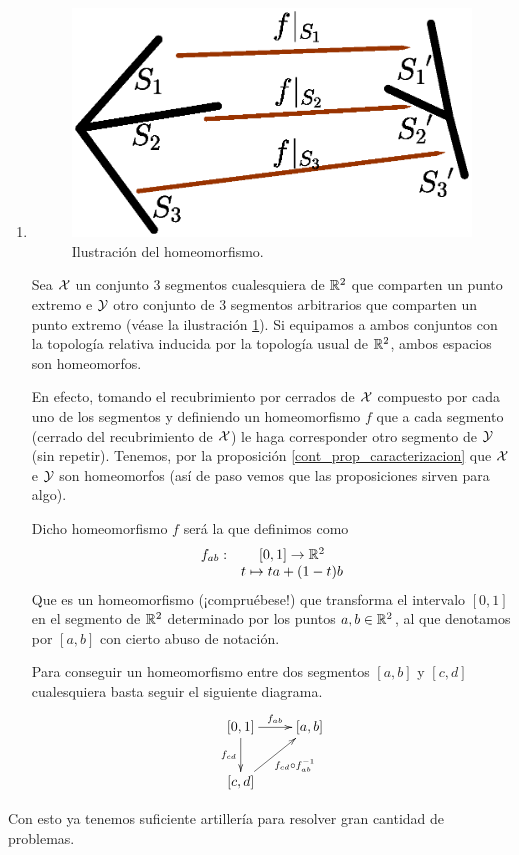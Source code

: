 \begin{exa}[Homeomorfismos]
\begin{enumerate}
		\item \begin{figure}[h!]
			\centering
			\includegraphics[scale = 0.3]{img/segmentos}
			\caption{Ilustración del homeomorfismo.}
			\label{cont_img_sementos}
		\end{figure}
		
		Sea $\mathcal{X}$ un conjunto $3$ segmentos cualesquiera de $\mathbb{R}^2$ que comparten un punto extremo e $\mathcal{Y}$ otro conjunto de $3$ segmentos arbitrarios que comparten un punto extremo (véase la ilustración \ref{cont_img_sementos}). Si equipamos a ambos conjuntos con la topología relativa inducida por la topología usual de $\mathbb{R}^2$, ambos espacios son homeomorfos.
		
		En efecto, tomando el recubrimiento por cerrados de $\mathcal{X}$ compuesto por cada uno de los segmentos y definiendo un homeomorfismo $f$ que a cada segmento (cerrado del recubrimiento de $\mathcal{X}$) le haga corresponder otro segmento de $\mathcal{Y}$ (sin repetir). Tenemos, por la proposición \ref{cont_prop_caracterizacion} que $\mathcal{X}$ e $\mathcal{Y}$ son homeomorfos (así de paso vemos que las proposiciones sirven para algo).
		
		Dicho homeomorfismo $f$ será la  que definimos como
		\begin{equation}
			\begin{array}{cc}
			f_{ab}:&[0,1]\to\mathbb{R}^2\\
			& t\mapsto ta+(1-t)b
			\end{array}
		\end{equation}
		Que es un homeomorfismo (¡compruébese!) que transforma el intervalo $[0,1]$ en el segmento de $\mathbb{R}^2$ determinado por los puntos $a,b\in\mathbb{R}^2$, al que denotamos por $[a,b]$ con cierto abuso de notación.
		
		Para conseguir un homeomorfismo entre dos segmentos $[a,b]$ y $[c,d]$ cualesquiera basta seguir el siguiente diagrama.
		\[\xymatrix{[0,1]\ar[r]^{f_{ab}}\ar[d]_{f_{cd}}&[a,b]\\
			[c,d]\ar[ru]_{f_{cd}\circ f^{-1}_{ab}}
			}\]
	\end{enumerate}
	Con esto ya tenemos suficiente artillería para resolver gran cantidad de problemas.
\end{exa}

